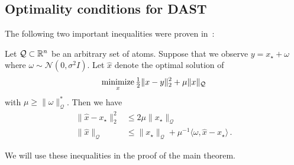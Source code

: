 \begin{subappendices}
\section{Optimality conditions for DAST}
The following two important inequalities were proven in~\cite[Section 2]{btr12}:
\begin{theorem}\label{thm:badri}
Let $\mathcal{Q}\subset \mathbb{R}^n$ be an arbitrary set of atoms.  Suppose that we observe $y = x_\star+\omega$ where $\omega\sim \mathcal{N}(0,\sigma^2 I)$.  Let $\hat{x}$ denote the optimal solution of
\[
	\mathop{\operatorname{minimize}}_x \tfrac{1}{2}\|x-y\|_2^2 + \mu \|x\|_\mathcal{Q}
\]
with  $\mu \geq\|\omega\|_{\mathcal{Q}}^*$.  Then we have
\begin{align}
	 \|\hat{x}-x_\star\|_2^2 &\leq 2 \mu \|x_\star\|_{\mathcal{Q}}\\
	 \|\hat{x}\|_{\mathcal{Q}} &\leq \|x_\star\|_{\mathcal{Q}} + \mu^{-1} \langle \omega, \hat{x}-x_\star\rangle\,.
\end{align}
\end{theorem}
We will use these inequalities in the proof of the main theorem.
\end{subappendices}

